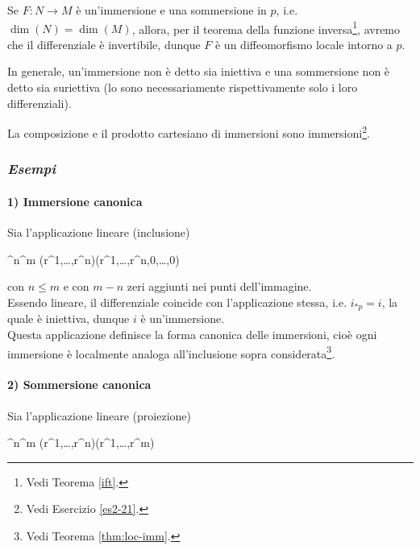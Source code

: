 \begin{remark}
	Se $ F : N \to M $ è un'immersione e una sommersione in $ p $, i.e. $ \dim(N) = \dim(M) $, allora, per il teorema della funzione inversa\footnote{%
		Vedi Teorema \ref{ift}.%
	}, avremo che il differenziale è invertibile, dunque $ F $ è un diffeomorfismo locale intorno a $ p $.
\end{remark}

\begin{remark}
	In generale, un'immersione non è detto sia iniettiva e una sommersione non è detto sia suriettiva (lo sono necessariamente rispettivamente solo i loro differenziali).
\end{remark}

\begin{remark}
	La composizione e il prodotto cartesiano di immersioni sono immersioni\footnote{%
		Vedi Esercizio \ref{es2-21}.%
	}.
\end{remark}

\subsubsection{\textit{Esempi}}

\paragraph{1) Immersione canonica}

Sia l'applicazione lineare (inclusione)

	{\R^{n}}{\R^{m}}
	{(r^{1},\dots,r^{n})}{(r^{1},\dots,r^{n},0,\dots,0)}

con $ n \leqslant m $ e con $ m-n $ zeri aggiunti nei punti dell'immagine.\\
Essendo lineare, il differenziale coincide con l'applicazione stessa, i.e. $ i_{*p} = i $, la quale è iniettiva, dunque $ i $ è un'immersione.\\
Questa applicazione definisce la forma canonica delle immersioni, cioè ogni immersione è localmente analoga all'inclusione sopra considerata\footnote{%
	Vedi Teorema \ref{thm:loc-imm}.%
}.

\paragraph{2) Sommersione canonica}

Sia l'applicazione lineare (proiezione)

\map{\pi}
	{\R^{n}}{\R^{m}}
	{(r^{1},\dots,r^{n})}{(r^{1},\dots,r^{m})}

